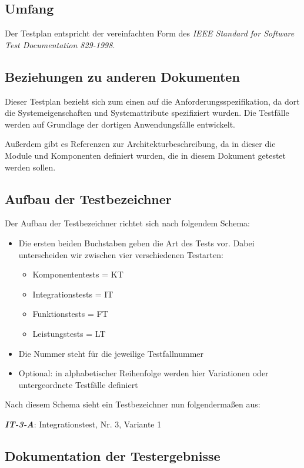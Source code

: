\documentclass[fontsize=12pt,paper=a4,twoside]{scrartcl}
\begin{document}
\subsection{Umfang}
Der Testplan entspricht der vereinfachten Form des \emph{IEEE Standard for Software Test Documentation 829-1998}. 

\subsection{Beziehungen zu anderen Dokumenten}
Dieser Testplan bezieht sich zum einen auf die Anforderungsspezifikation, da dort die Systemeigenschaften und Systemattribute spezifiziert wurden. Die Testfälle werden auf Grundlage der dortigen Anwendungsfälle entwickelt.

Außerdem gibt es Referenzen zur Architekturbeschreibung, da in dieser die Module und Komponenten definiert wurden, die in diesem Dokument getestet werden sollen.


\subsection{Aufbau der Testbezeichner}
\label{sec:aufb-der-testb}

Der Aufbau der Testbezeichner richtet sich nach folgendem Schema:
\begin{itemize}
\item Die ersten beiden Buchstaben geben die Art des Tests vor. Dabei unterscheiden wir zwischen vier verschiedenen Testarten:
\begin{itemize}
	\item Komponententests = KT
	\item Integrationstests = IT
	\item Funktionstests = FT
	\item Leistungstests = LT
\end{itemize}
\item Die Nummer steht für die jeweilige Testfallnummer

\item Optional: in alphabetischer Reihenfolge werden hier Variationen oder untergeordnete Testfälle definiert
\end{itemize}
Nach diesem Schema sieht ein Testbezeichner nun folgendermaßen aus:

\textbf{\emph{IT-3-A}}: Integrationstest, Nr. 3, Variante 1

\subsection{Dokumentation der Testergebnisse}
\end{document}
